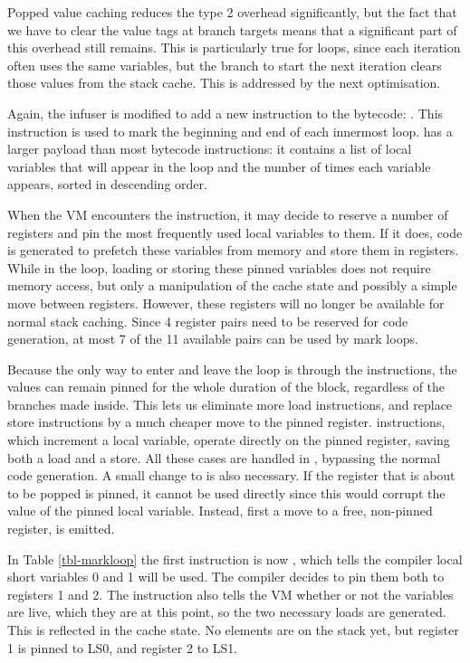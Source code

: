 Popped value caching reduces the type 2 overhead significantly, but the fact that we have to clear the value tags at branch targets means that a significant part of this overhead still remains. This is particularly true for loops, since each iteration often uses the same variables, but the branch to start the next iteration clears those values from the stack cache. This is addressed by the next optimisation.

Again, the infuser is modified to add a new instruction to the bytecode: . This instruction is used to mark the beginning and end of each innermost loop.  has a larger payload than most bytecode instructions: it contains a list of local variables that will appear in the loop and the number of times each variable appears, sorted in descending order.

When the VM encounters the  instruction, it may decide to reserve a number of registers and pin the most frequently used local variables to them. If it does, code is generated to prefetch these variables from memory and store them in registers. While in the loop, loading or storing these pinned variables does not require memory access, but only a manipulation of the cache state and possibly a simple move between registers. However, these registers will no longer be available for normal stack caching. Since 4 register pairs need to be reserved for code generation, at most 7 of the 11 available pairs can be used by mark loops.

Because the only way to enter and leave the loop is through the  instructions, the values can remain pinned for the whole duration of the block, regardless of the branches made inside. This lets us eliminate more load instructions, and replace store instructions by a much cheaper move to the pinned register.  instructions, which increment a local variable, operate directly on the pinned register, saving both a load and a store. All these cases are handled in , bypassing the normal code generation. A small change to  is also necessary. If the register that is about to be popped is pinned, it cannot be used directly since this would corrupt the value of the pinned local variable. Instead, first a move to a free, non-pinned register, is emitted.

In Table \ref{tbl-markloop} the first instruction is now , which tells the compiler local short variables 0 and 1 will be used. The compiler decides to pin them both to registers 1 and 2. The  instruction also tells the VM whether or not the variables are live, which they are at this point, so the two necessary loads are generated. This is reflected in the cache state. No elements are on the stack yet, but register 1 is pinned to LS0, and register 2 to LS1.

